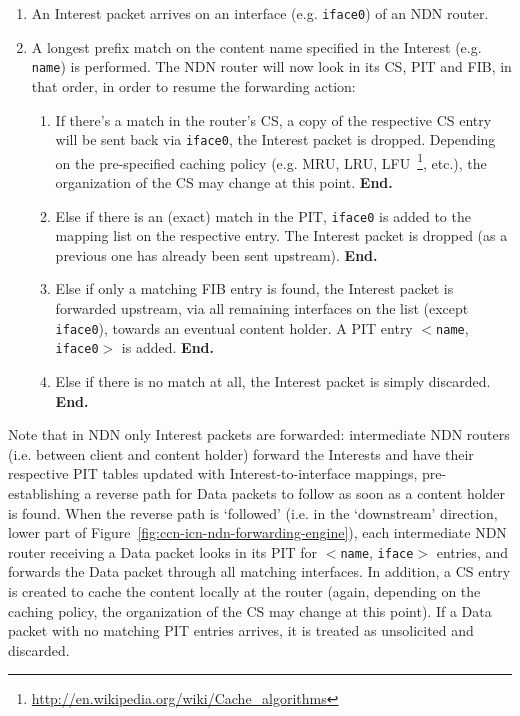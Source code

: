 \begin{enumerate}

    \item An Interest packet arrives on an interface (e.g. \verb+iface0+) of an NDN router.
    \item A longest prefix match on the content name specified in the Interest (e.g. \verb+name+) 
        is performed. The NDN router will now look in its CS, PIT and FIB, in 
        that order, in order to resume the forwarding action:
        \begin{enumerate}

            \item If there's a match in the router's CS, a copy of the respective 
                CS entry will be sent back via \verb+iface0+, the Interest 
                packet is dropped. Depending on the pre-specified 
                caching policy (e.g. MRU, LRU, LFU~\footnote{\url{http://en.wikipedia.org/wiki/Cache_algorithms}}, 
                etc.), the organization of the CS 
                may change at this point. \textbf{End.}

            \item Else if there is an (exact) match in the PIT, \verb+iface0+ is 
                added to the mapping list on the respective entry. The 
                Interest packet is dropped (as a previous one has already been 
                sent upstream). \textbf{End.}

            \item Else if only a matching FIB entry is found, the Interest 
                packet is forwarded upstream, via all remaining interfaces on the 
                list (except \verb+iface0+), towards an eventual content holder. A PIT 
                entry $<$\verb+name+, \verb+iface0+$>$ is added. \textbf{End.}

            \item Else if there is no match at all, the Interest packet is 
                simply discarded. \textbf{End.}\shortvertbreak

        \end{enumerate}

\end{enumerate}

Note that in NDN only Interest packets are forwarded: intermediate NDN 
routers (i.e. between client and content holder) forward the 
Interests and have their respective PIT tables updated with Interest-to-interface 
mappings, pre-establishing a reverse path for Data packets to follow as soon as a 
content holder is found. When the reverse path is `followed' (i.e. in the 
`downstream' direction, lower part of Figure~\ref{fig:ccn-icn-ndn-forwarding-engine}), each 
intermediate NDN router receiving a 
Data packet looks in its PIT for $<$\verb+name+, \verb+iface+$>$ entries, 
and forwards the Data packet through all matching interfaces. In addition, a 
CS entry is created to cache the content locally at the router (again, depending 
on the caching policy, the organization of the CS may change at this point). If a Data packet 
with no matching PIT entries arrives, it is treated as unsolicited and discarded.

